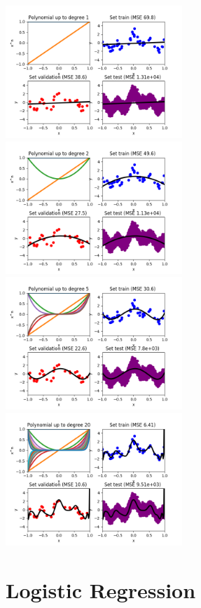 \documentclass[a4paper]{article}
\begin{document}
\noindent
\includegraphics[width=0.5\textwidth]{linreg_deg1.png}%
\includegraphics[width=0.5\textwidth]{linreg_deg2.png}\\[2em]
\includegraphics[width=0.5\textwidth]{linreg_deg5.png}%
\includegraphics[width=0.5\textwidth]{linreg_deg20.png}\par

\section{Logistic Regression}
\end{document}
